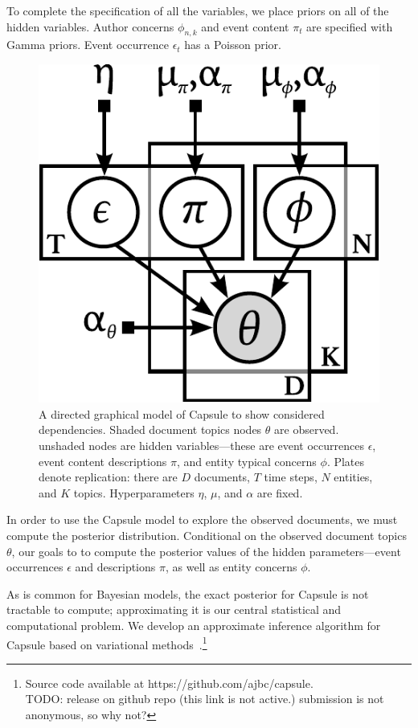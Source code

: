 To complete the specification of all the variables, we place priors on all of the hidden variables.  Author concerns $\phi_{n,k}$ and event content $\pi_t$ are specified with Gamma priors.  Event occurrence $\epsilon_t$ has a Poisson prior.

\begin{figure}
\centering
\includegraphics[width=0.5\linewidth]{fig/graphicalmodel.pdf}
\caption{A directed graphical model of Capsule to show considered dependencies. Shaded document topics nodes $\theta$ are observed. unshaded nodes are hidden variables---these are event occurrences $\epsilon$, event content descriptions $\pi$, and entity typical concerns $\phi$. Plates denote replication: there are $D$ documents, $T$ time steps, $N$ entities, and $K$ topics. Hyperparameters $\eta$, $\mu$, and $\alpha$ are fixed.}
\label{fig:graphicalmodel}
\end{figure}

In order to use the Capsule model to explore the observed documents, we must compute the posterior distribution.  Conditional on the observed document topics $\theta$, our goals to to compute the posterior values of the hidden parameters---event occurrences $\epsilon$ and descriptions $\pi$, as well as entity concerns $\phi$.

As is common for Bayesian models, the exact posterior for Capsule is not tractable to compute; approximating it is our central statistical and computational problem.  We develop an approximate inference algorithm for Capsule based on variational methods~\cite{Wainwright:2008}.\footnote{Source code available at https://github.com/ajbc/capsule.\\ TODO: release on github repo (this link is not active.)  submission is not anonymous, so why not?}

